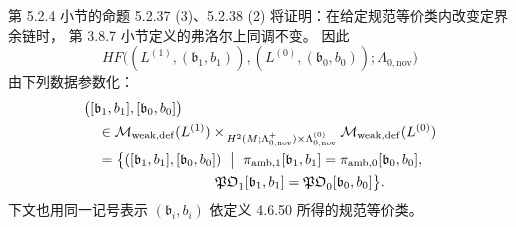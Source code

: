 第 5.2.4 小节的命题 5.2.37 (3)、5.2.38 (2)
将证明：在给定规范等价类内改变定界余链时，
第 3.8.7 小节定义的弗洛尔上同调不变。
因此
\[
HF\bigl((L^{(1)},(\mathfrak b_1,b_1)),
        (L^{(0)},(\mathfrak b_0,b_0));
        \Lambda_{0,\mathrm{nov}}\bigr)
\]
由下列数据参数化：
\[
\begin{aligned}
&\bigl([\mathfrak b_1,b_1],
       [\mathfrak b_0,b_0]\bigr)\\
&\quad\in
\mathcal M_{\mathrm{weak,def}}(L^{(1)})
\times_{\,
 H^2(M;\Lambda^+_{0,\mathrm{nov}})
 \times\Lambda_{0,\mathrm{nov}}^{(0)}}
\mathcal M_{\mathrm{weak,def}}(L^{(0)})\\
&\quad=
\bigl\{
([\mathfrak b_1,b_1],[\mathfrak b_0,b_0])
\ \bigm|\
\pi_{\mathrm{amb},1}[\mathfrak b_1,b_1]
=\pi_{\mathrm{amb},0}[\mathfrak b_0,b_0],\\
&\hspace{33mm}
\mathfrak{PO}_1[\mathfrak b_1,b_1]
=\mathfrak{PO}_0[\mathfrak b_0,b_0]
\bigr\}.
\end{aligned}
\]
下文也用同一记号表示
$(\mathfrak b_i,b_i)$ 依定义 4.6.50 所得的规范等价类。
